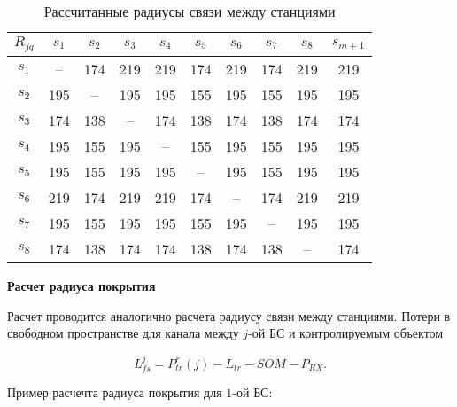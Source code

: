 \begin{table}[h!]\centering
  \begin{tabular}{|c||c|c|c|c|c|c|c|c|c|}\hline
      $R_{jq}$ & $s_1$ & $s_2$ & $s_3$ & $s_4$ & $s_5$ & $s_6$ & $s_7$ & $s_8$ & $s_{m+1}$ \\ \hline \hline

      $s_1$ &--& 174& 219& 219& 174& 219& 174& 219& 219\\ 
      $s_2$ &195& --& 195& 195& 155& 195& 155& 195& 195\\ 
      $s_3$ &174& 138& --& 174& 138& 174& 138& 174& 174\\ 
      $s_4$ &195& 155& 195& --& 155& 195& 155& 195& 195\\ 
      $s_5$ &195& 155& 195& 195& --& 195& 155& 195& 195\\ 
      $s_6$ &219& 174& 219& 219& 174& --& 174& 219& 219\\
      $s_7$ &195& 155& 195& 195& 155& 195& --& 195& 195\\ 
      $s_8$ &174& 138& 174& 174& 138& 174& 138& --& 174\\ 
      \hline

\end{tabular}\caption{Рассчитанные радиусы связи между станциями}\label{tab:part3_Rjq}
\end{table}

\textbf{Расчет радиуса покрытия}



Расчет проводится аналогично расчета радиусу связи между станциями. 
Потери в свободном пространстве для канала между $j$-ой БС и контролируемым объектом

\begin{displaymath}
  L_{fs}^{j} = P_{tr}^r(j) - L_{tr}  - SOM - P_{RX}. 
\end{displaymath}


Пример расчечта радиуса покрытия для  $1$-ой БС:

